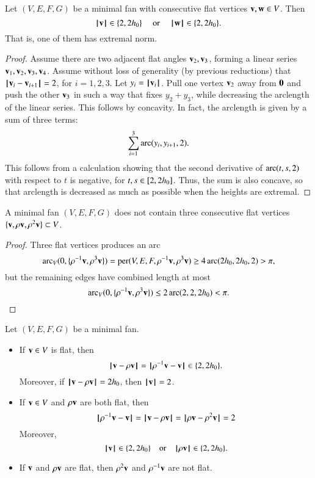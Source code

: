 \begin{lemma} Let $(V,E,F,G)$ be a minimal fan with consecutive flat vertices $\v,\w\in V$.  Then 
$$\normo{\v}\in \{2,2\hm\}\quad\text{ or }\quad \normo{\w}\in \{2,2\hm\}.$$
That is, one of them has extremal norm.
%
%
\end{lemma}

\begin{proof}
Assume there are two adjacent flat angles $\v_2,\v_3$, forming a linear series $\v_1,\v_2,\v_3,\v_4$.
Assume without loss of generality (by previous reductions) that
%
$\norm{\v_i}{\v_{i+1}}=2$, for $i=1,2,3$.
Let $y_i = \normo{\v_i}$.
Pull one vertex $\v_2$ away from $\orz$ and push the other $\v_3$ in such a way that fixes $y_2+y_3$, while decreasing the arclength of the linear series.  This follows by concavity.
In fact, the arclength is given by a sum of three terms:
  $$
  \sum_{i=1}^3\arc(y_i,y_{i+1},2).
  $$
This follows from a calculation showing that the second derivative of $\arc(t,s,2)$ with respect to $t$ is negative, for $t,s\in[2,2\hm]$.  Thus, the
sum is also concave, so that arclength is decreased as much as possible when the heights are extremal.
\end{proof}

\begin{lemma}
A minimal fan $(V,E,F,G)$ does not contain three consecutive flat vertices $\{\v,\rho \v,\rho^2 \v\}\subset V$.
\end{lemma}

\begin{proof}  Three flat vertices produces an arc
$$
\arc_V(0,\{\rho^{-1} \v,\rho^3 \v\}) = \op{per}(V,E,F,\rho^{-1}\v,\rho^3 \v) \ge4\arc(2\hm,2\hm,2) > \pi,
$$
but the remaining edges  have combined length at most
$$
\arc_V(0,\{\rho^{-1} \v,\rho^3 \v\})\le 2\arc(2,2,2\hm) < \pi.
$$
\end{proof}

\begin{lemma}
Let $(V,E,F,G)$ be a  minimal fan.
\begin{itemize} 
\item If $\v\in V$ is flat, then 
  $$\norm{\v}{\rho \v}=\norm{\rho^{-1}\v}{\v}\in \{2,2\hm\}.$$
  Moreover, if $\norm{\v}{\rho \v}=2\hm$, then $\normo{\v}=2$.
\item If $\v\in V$ and $\rho \v$ are both flat, then
$$
\norm{\rho^{-1}\v}{\v} = \norm{\v}{\rho \v} = \norm{\rho \v}{\rho^2 \v} = 2
$$
Moreover,
  $$
\normo{\v}\in \{2,2\hm\}\quad\text{or}\quad \normo{\rho \v}\in \{2,2\hm\}.
$$
\item If $\v$ and $\rho \v$ are flat, then $\rho^2 \v$ and $\rho^{-1}\v$ are not flat.
\end{itemize}
\end{lemma}

